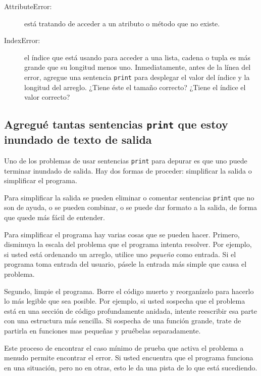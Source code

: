 \begin{description}

\item[AttributeError:] está tratando de acceder a un atributo o método
que no existe.


\item[IndexError:] el índice que está usando para acceder a una lista,
cadena o tupla es más grande que su longitud menos uno. Inmediatamente,
antes de la línea del error, agregue una sentencia \texttt{print} para
desplegar el valor del índice y la longitud del arreglo. ¿Tiene éste
el tamaño correcto? ¿Tiene el índice el valor correcto?


\end{description}


\subsection{Agregué tantas sentencias \texttt{print} que estoy inundado
de texto de salida}

Uno de los problemas de usar sentencias \texttt{print} para depurar
es que uno puede terminar inundado de salida. Hay dos formas de
proceder: simplificar la salida o simplificar el programa.

Para simplificar la salida se pueden eliminar o comentar sentencias
\texttt{print} que no son de ayuda, o se pueden combinar, o se
puede dar formato a la salida, de forma que quede más fácil de entender.

Para simplificar el programa hay varias cosas que se pueden hacer. Primero,
disminuya la escala del problema que el programa intenta resolver. Por ejemplo,
si usted está ordenando un arreglo, utilice uno {\em pequeño} como entrada. 
Si el programa toma entrada del usuario, pásele la entrada más simple
que causa el problema.

Segundo, limpie el programa. Borre el código muerto y reorganízelo
para hacerlo lo más legible que sea posible. Por ejemplo, si usted
sospecha que el problema está en una sección de código profundamente anidada,
intente reescribir esa parte con una estructura más sencilla. Si sospecha
de una función grande, trate de partirla en funciones mas pequeñas y
pruébelas separadamente.

Este proceso de encontrar el caso mínimo de prueba que activa el problema
a menudo permite encontrar el error. Si usted encuentra que el programa
funciona en una situación, pero no en otras, esto le da una pista de lo
que está sucediendo.

